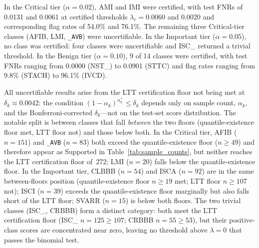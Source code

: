 In the Critical tier ($\alpha{=}0.02$), AMI and IMI were certified, with test FNRs
of 0.0131 and 0.0061 at certified thresholds $\lambda_c{=}0.0060$ and 0.0020 and
corresponding flag rates of 54.0\% and 76.1\%.
The remaining three Critical-tier classes (AFIB, LMI, \texttt{\_AVB}) were
uncertifiable.
In the Important tier ($\alpha{=}0.05$), no class was certified: four classes were
uncertifiable and ISC\_ returned a trivial threshold.
In the Benign tier ($\alpha{=}0.10$), 9 of 14 classes were certified, with test
FNRs ranging from 0.0000 (NST\_) to 0.0901 (STTC) and flag rates ranging from
9.8\% (STACH) to 96.1\% (IVCD).

All uncertifiable results arise from the LTT certification floor not being met
at $\delta_k\approx 0.0042$: the condition $(1-\alpha_k)^{n_k^+}\le\delta_k$
depends only on sample count, $\alpha_k$, and the Bonferroni-corrected
$\delta_k$---not on the test-set score distribution.
The notable split is between classes that fall \emph{between} the two floors
(quantile-existence floor met, LTT floor not) and those below both.
In the Critical tier, AFIB ($n{=}151$) and \texttt{\_AVB} ($n{=}83$) both exceed
the quantile-existence floor ($n\ge 49$) and therefore appear as Supported in
Table~\ref{tab:sample_counts}, but neither reaches the LTT certification floor
of~272; LMI ($n{=}20$) falls below the quantile-existence floor.
In the Important tier, CLBBB ($n{=}54$) and ISCA ($n{=}92$) are in the same
between-floors position (quantile-existence floor $n\ge 19$ met; LTT floor
$n\ge 107$ not); ISCI ($n{=}39$) exceeds the quantile-existence floor marginally
but also falls short of the LTT floor; SVARR ($n{=}15$) is below both floors.
The two trivial classes (ISC\_, CRBBB) form a distinct category: both meet the LTT
certification floor (ISC\_ $n{=}125\ge 107$; CRBBB $n{=}55\ge 53$), but their
positive-class scores are concentrated near zero, leaving no threshold above
$\lambda{=}0$ that passes the binomial test.

